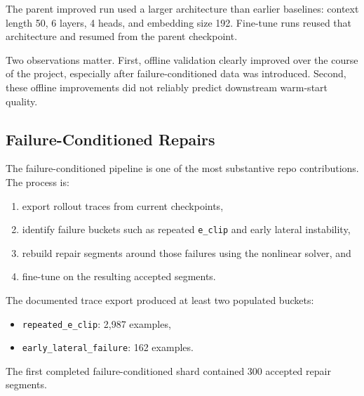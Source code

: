 The parent improved run used a larger architecture than earlier baselines: context length 50, 6 layers, 4 heads, and embedding size 192. Fine-tune runs reused that architecture and resumed from the parent checkpoint.

Two observations matter. First, offline validation clearly improved over the course of the project, especially after failure-conditioned data was introduced. Second, these offline improvements did not reliably predict downstream warm-start quality.

\subsection{Failure-Conditioned Repairs}

The failure-conditioned pipeline is one of the most substantive repo contributions. The process is:
\begin{enumerate}
\item export rollout traces from current checkpoints,
\item identify failure buckets such as repeated \texttt{e\_clip} and early lateral instability,
\item rebuild repair segments around those failures using the nonlinear solver, and
\item fine-tune on the resulting accepted segments.
\end{enumerate}

The documented trace export produced at least two populated buckets:
\begin{itemize}
\item \texttt{repeated\_e\_clip}: 2,987 examples,
\item \texttt{early\_lateral\_failure}: 162 examples.
\end{itemize}

The first completed failure-conditioned shard contained 300 accepted repair segments.

